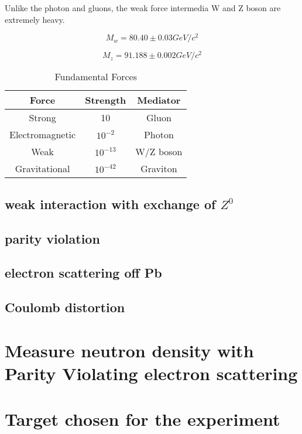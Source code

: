 Unlike the photon and gluons, the weak force intermedia W and Z boson are extremely heavy. 

\begin{equation}
    M_w = 80.40 \pm 0.03 GeV/c^2
\end{equation}

\begin{equation}
    M_z = 91.188 \pm 0.002 GeV/c^2
\end{equation}

\begin{table}[!h]
    \centering
    \begin{tabular}{c |c | c}
         Force  & Strength & Mediator \\ \hline
         Strong & 10  & Gluon \\ \hline
         Electromagnetic & $10^{-2}$ &  Photon \\ \hline
         Weak & $10^{-13}$ & W/Z boson \\ \hline
         Gravitational & $10^{-42}$ & Graviton \\ \hline
    \end{tabular}
    \caption{Fundamental Forces}
    \label{tab:my_label}
\end{table}

\subsection{weak interaction with exchange of $Z^0$}
\subsection{ parity violation}
\subsection{electron scattering off Pb}

\subsection{Coulomb distortion}

\section{Measure neutron density with Parity Violating electron scattering}

\section{Target chosen for the experiment}
